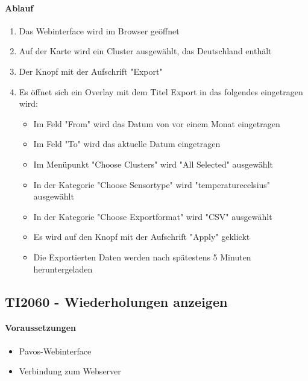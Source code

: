 \paragraph{Ablauf}
\begin{enumerate}
\item Das Webinterface wird im Browser geöffnet
\item Auf der Karte wird ein Cluster ausgewählt, das Deutschland enthält
\item Der Knopf mit der Aufschrift "Export"
\item Es öffnet sich ein Overlay mit dem Titel Export in das folgendes eingetragen wird:
\begin{itemize}
\item Im Feld "From" wird das Datum von vor einem Monat eingetragen
\item Im Feld "To" wird das aktuelle Datum eingetragen
\item Im Menüpunkt  "Choose Clusters" wird "All Selected" ausgewählt
\item In der Kategorie "Choose Sensortype" wird "temperature\textunderscore celsius" ausgewählt
\item In der Kategorie "Choose Exportformat" wird "CSV" ausgewählt
\item Es wird auf den Knopf mit der Aufschrift "Apply" geklickt
\item Die Exportierten Daten werden nach spätestens 5 Minuten heruntergeladen
\end{itemize}
\end{enumerate}
\szenarioGood

\subsection{TI2060 - Wiederholungen anzeigen}
\paragraph{Voraussetzungen}
\begin{itemize}
\item Pavos-Webinterface
\item Verbindung zum Webserver
\end{itemize}
